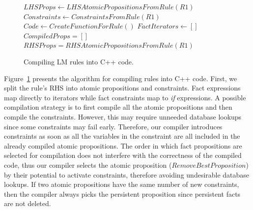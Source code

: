 \begin{figure}
\begin{algorithm}[H]
 $LHSProps \longleftarrow LHSAtomicPropositionsFromRule(R1)$\;
 $Constraints \longleftarrow ConstraintsFromRule(R1)$\;
 $Code \longleftarrow CreateFunctionForRule()$\;
 $FactIterators \longleftarrow []$\;
 $CompiledProps = []$\;
 $RHSProps = RHSAtomicPropositionsFromRule(R1)$\;
\end{algorithm}
 \caption{Compiling LM rules into C++ code.}
 \label{alg:compile_rule}
\end{figure}

Figure~\ref{alg:compile_rule} presents the algorithm for compiling rules into
C++ code. First, we split the rule's RHS into atomic propositions and
constraints. Fact expressions map directly to iterators while fact constraints
map to \emph{if} expressions. A possible compilation strategy is to first
compile all the atomic propositions and then compile the constraints. However,
this may require unneeded database lookups since some constraints may fail
early.  Therefore, our compiler introduces constraints as soon as all the
variables in the constraint are all included in the already compiled atomic
propositions. The order in which fact propositions are selected for compilation
does not interfere with the correctness of the compiled code, thus our compiler
selects the atomic proposition ($RemoveBestProposition$) by their potential to
activate constraints, therefore avoiding undesirable database lookups. If two
atomic propositions have the same number of new constraints, then the compiler
always picks the persistent proposition since persistent facts are not deleted.

